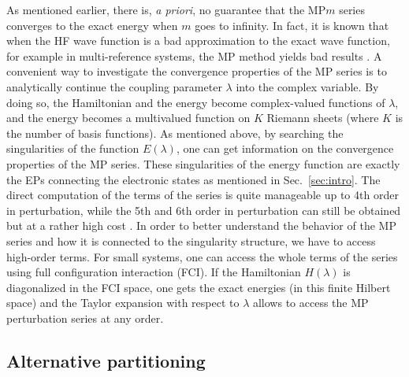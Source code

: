 \documentclass[11pt,a4paper]{article}
\begin{document}
As mentioned earlier, there is, \textit{a priori}, no guarantee that the MP$m$ series converges to the exact energy when $m$ goes to infinity. 
In fact, it is known that when the HF wave function is a bad approximation to the exact wave function, for example in multi-reference systems, the MP method yields bad results \cite{Gill_1986, Gill_1988, Handy_1985, Lepetit_1988}. 
A convenient way to investigate the convergence properties of the MP series is to analytically continue the coupling parameter $\lambda$ into the complex variable. 
By doing so, the Hamiltonian and the energy become complex-valued functions of $\lambda$, and the energy becomes a multivalued function on $K$ Riemann sheets (where $K$ is the number of basis functions).
As mentioned above, by searching the singularities of the function $E(\lambda)$, one can get information on the convergence properties of the MP series. 
These singularities of the energy function are exactly the EPs connecting the electronic states as mentioned in Sec.~\ref{sec:intro}. 
The direct computation of the terms of the series is quite manageable up to 4th order in perturbation, while the 5th and 6th order in perturbation can still be obtained but at a rather high cost \cite{JensenBook}. 
In order to better understand the behavior of the MP series and how it is connected to the singularity structure, we have to access high-order terms. 
For small systems, one can access the whole terms of the series using full configuration interaction (FCI). 
If the Hamiltonian $H(\lambda)$ is diagonalized in the FCI space, one gets the exact energies (in this finite Hilbert space) and the Taylor expansion with respect to $\lambda$ allows to access the MP perturbation series at any order.

\subsection{Alternative partitioning}\label{sec:AlterPart}
\end{document}
